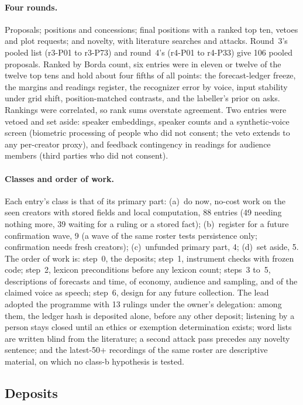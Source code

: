 \paragraph{Four rounds.} Proposals; positions and concessions; final positions with a ranked top ten, vetoes and plot
requests; and novelty, with literature searches and attacks. Round~3's pooled list (r3-P01 to r3-P73) and round~4's
(r4-P01 to r4-P33) give 106 pooled proposals. Ranked by Borda count, six entries were in eleven or twelve of the twelve
top tens and hold about four fifths of all points: the forecast-ledger freeze, the margins and readings register, the
recognizer error by voice, input stability under grid shift, position-matched contrasts, and the labeller's prior on
asks. Rankings were correlated, so rank sums overstate agreement. Two entries were vetoed and set aside: speaker
embeddings, speaker counts and a synthetic-voice screen (biometric processing of people who did not consent; the veto
extends to any per-creator proxy), and feedback contingency in readings for audience members (third parties who did not consent).

\paragraph{Classes and order of work.} Each entry's class is that of its primary part: (a)~do now, no-cost work on the
seen creators with stored fields and local computation, 88 entries (49 needing nothing more, 39 waiting for a ruling or
a stored fact); (b)~register for a future confirmation wave, 9 (a wave of the same roster tests persistence only;
confirmation needs fresh creators); (c)~unfunded primary part, 4; (d)~set aside, 5. The order of work is: step~0, the
deposits; step~1, instrument checks with frozen code; step~2, lexicon preconditions before any lexicon count; steps~3
to~5, descriptions of forecasts and time, of economy, audience and sampling, and of the claimed voice as speech; step~6,
design for any future collection. The lead adopted the programme with 13 rulings under the owner's delegation: among
them, the ledger hash is deposited alone, before any other deposit; listening by a person stays closed until an ethics or exemption
determination exists; word lists are written blind from the literature; a second attack pass precedes any novelty
sentence; and the latest-50+ recordings of the same roster are descriptive material, on which no class-b hypothesis is
tested.

\subsection{Deposits}
\label{app:panel3-deposits}

